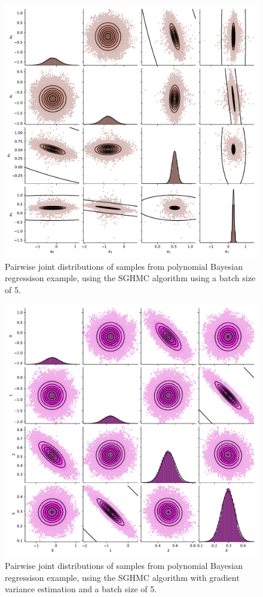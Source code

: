 \begin{figure}[htbp]
    \centering
    \includegraphics[width=\linewidth]{Figures/simulated_pairs_SGHMC_5.pdf}
    \caption{Pairwise joint distributions of samples from polynomial Bayesian regressison example, using the SGHMC algorithm using a batch size of 5.}
    \label{fig:pairs-sghmc-5}
\end{figure}

\begin{figure}[htbp]
    \centering
    \includegraphics[width=\linewidth]{Figures/simulated_pairs_SGHMCWithVarianceEstimator_5.pdf}
    \caption{Pairwise joint distributions of samples from polynomial Bayesian regressison example, using the SGHMC algorithm with gradient variance estimation  and a batch size of 5.}
    \label{fig:pairs-sghmc-var-est-5}
\end{figure}

